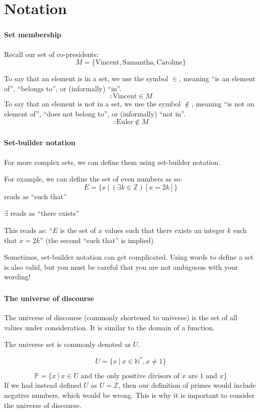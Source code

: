 \documentclass[mathserif]{beamer}
\newenvironment{compactmath}[1][\normalsize]%
	{\begin{minipage}{\textwidth}\vspace{-0.75\baselineskip}#1\begin{equation*}}
	{\end{equation*}\end{minipage}}
\begin{document}
	\section{Notation}
	\begin{frame}
		\frametitle{\secname}
		\framesubtitle{Set membership}
		Recall our set of co-presidents:
		\[M = \{\text{Vincent}, \text{Samantha}, \text{Caroline}\}\]
		
		To say that an element is in a set, we use the symbol $\in$, meaning ``is an element of'', ``belongs to'', or (informally) ``in''.
		\[\therefore \text{Vincent} \in M\]
		To say that an element is not in a set, we use the symbol $\notin$, meaning ``is not an element of'', ``does not belong to'', or (informally) ``not in''.
		\[\therefore \text{Euler} \notin M\]
	\end{frame}
	\begin{frame}
		\frametitle{\secname}
		\framesubtitle{Set-builder notation}
		For more complex sets, we can define them using set-builder notation.

		For example, we can define the set of even numbers as so:
		\[E = \{x\ |\ (\exists k \in \mathbb{Z})[x = 2k]\}\]
		\textbar{} reads as ``such that''

		$\exists$ reads as ``there exists''

		This reads as: ``$E$ is the set of $x$ values such that there exists an integer $k$ such that $x = 2k$'' (the second ``such that'' is implied).

		\scriptsize
		Sometimes, set-builder notation can get complicated. Using words to define a set is also valid, but you must be careful that you are \alert{not} ambiguous with your wording!
	\end{frame}
	\begin{frame}
		\frametitle{\secname}
		\framesubtitle{The universe of discourse}
		The universe of discourse (commonly shortened to universe) is the set of all values under consideration. It is similar to the domain of a function.

		The universe set is commonly denoted as $U$.
		\begin{example}
			\begin{compactmath}
				U = \{x\ |\ x \in \mathbb{N}^*, x \neq 1\}
			\end{compactmath}
			\[\mathbb{P} = \{x\ |\ x \in U \text{ and the only positive divisors of $x$ are $1$ and $x$}\}\]
			If we had instead defined $U$ as $U = \mathbb{Z}$, then our definition of primes would include negative numbers, which would be wrong. This is why it is important to consider the universe of discourse.
		\end{example}
	\end{frame}
\end{document}
